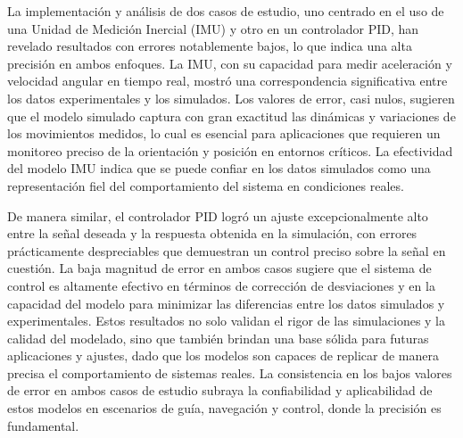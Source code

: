 La implementación y análisis de dos casos de estudio, uno centrado en el uso de una Unidad de Medición Inercial (IMU) y otro en un controlador PID, han revelado resultados con errores notablemente bajos, lo que indica una alta precisión en ambos enfoques. La IMU, con su capacidad para medir aceleración y velocidad angular en tiempo real, mostró una correspondencia significativa entre los datos experimentales y los simulados. Los valores de error, casi nulos, sugieren que el modelo simulado captura con gran exactitud las dinámicas y variaciones de los movimientos medidos, lo cual es esencial para aplicaciones que requieren un monitoreo preciso de la orientación y posición en entornos críticos. La efectividad del modelo IMU indica que se puede confiar en los datos simulados como una representación fiel del comportamiento del sistema en condiciones reales.

De manera similar, el controlador PID logró un ajuste excepcionalmente alto entre la señal deseada y la respuesta obtenida en la simulación, con errores prácticamente despreciables que demuestran un control preciso sobre la señal en cuestión. La baja magnitud de error en ambos casos sugiere que el sistema de control es altamente efectivo en términos de corrección de desviaciones y en la capacidad del modelo para minimizar las diferencias entre los datos simulados y experimentales. Estos resultados no solo validan el rigor de las simulaciones y la calidad del modelado, sino que también brindan una base sólida para futuras aplicaciones y ajustes, dado que los modelos son capaces de replicar de manera precisa el comportamiento de sistemas reales. La consistencia en los bajos valores de error en ambos casos de estudio subraya la confiabilidad y aplicabilidad de estos modelos en escenarios de guía, navegación y control, donde la precisión es fundamental.